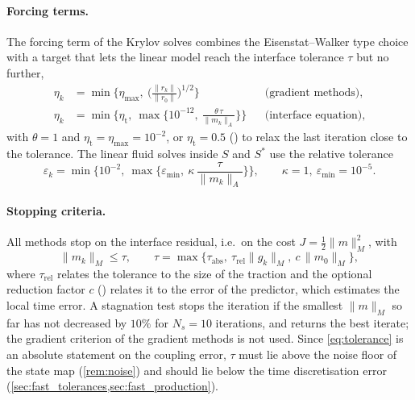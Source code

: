 \documentclass[11pt,a4paper]{article}
\theoremstyle{definition}
\theoremstyle{remark}
\newcommand{\M}{M}
\begin{document}
\paragraph{Forcing terms.} The forcing term of the Krylov solves combines the Eisenstat--Walker type
choice with a target that lets the linear model reach the interface tolerance $\tau$ but no further,
\begin{align}
  \eta_k&=\min\Big\{\eta_{\max},\ \Big(\frac{\|r_k\|}{\|r_0\|}\Big)^{1/2}\Big\}
  &&\text{(gradient methods)},\nonumber\\
  \eta_k&=\min\Big\{\eta_{\mathrm t},\ \max\Big\{10^{-12},\ \frac{\theta\,\tau}{\|m_k\|_A}\Big\}\Big\}
  &&\text{(interface equation)},\label{eq:forcing}
\end{align}
with $\theta=1$ and $\eta_{\mathrm t}=\eta_{\max}=10^{-2}$, or $\eta_{\mathrm t}=0.5$
() to relax the last iteration close to the tolerance. The linear fluid
solves inside $S$ and $S^*$ use the relative tolerance
\begin{equation}\label{eq:lin_tol}
  \varepsilon_k=\min\Big\{10^{-2},\ \max\Big\{\varepsilon_{\min},\ \kappa\,\frac{\tau}{\|m_k\|_A}\Big\}\Big\},
  \qquad \kappa=1,\ \varepsilon_{\min}=10^{-5}.
\end{equation}

\paragraph{Stopping criteria.} All methods stop on the interface residual, i.e.\ on the cost
$J=\frac12\|m\|_{\M}^2$, with
\begin{equation}\label{eq:tolerance}
  \|m_k\|_{\M}\le\tau,\qquad
  \tau=\max\big\{\tau_{\mathrm{abs}},\ \tau_{\mathrm{rel}}\|g_k\|_{\M},\ c\,\|m_0\|_{\M}\big\},
\end{equation}
where $\tau_{\mathrm{rel}}$ relates the tolerance to the size of the traction and the optional
reduction factor $c$ () relates it to the error of the predictor, which
estimates the local time error. A stagnation test stops the iteration if the smallest
$\|m\|_{\M}$ so far has not decreased by $10\%$ for $N_s=10$ iterations, and returns the best
iterate; the gradient criterion of the gradient methods is not used.
Since \eqref{eq:tolerance} is an absolute statement on the coupling error, $\tau$ must lie above the
noise floor of the state map (\cref{rem:noise}) and should lie below the time discretisation error
(\cref{sec:fast_tolerances,sec:fast_production}).
\end{document}
